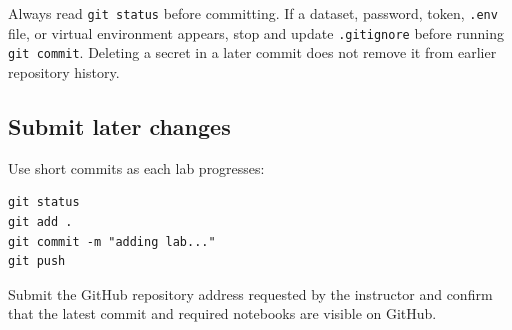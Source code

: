 \begin{pitfall}
Always read \texttt{git status} before committing. If a dataset, password,
token, \texttt{.env} file, or virtual environment appears, stop and update
\texttt{.gitignore} before running \texttt{git commit}. Deleting a secret in a
later commit does not remove it from earlier repository history.
\end{pitfall}

\subsection{Submit later changes}

Use short commits as each lab progresses:

\begin{lstlisting}[style=utpterminal]
git status
git add .
git commit -m "adding lab..."
git push
\end{lstlisting}

Submit the GitHub repository address requested by the instructor and confirm that the latest commit and required notebooks are visible on GitHub.
